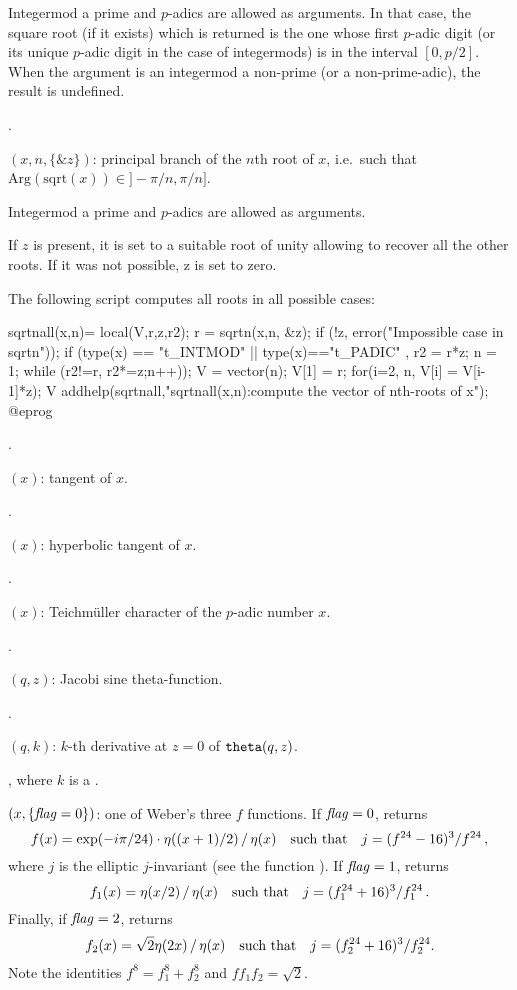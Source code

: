Integermod a prime and $p$-adics are allowed as arguments. In that case,
the square root (if it exists) which is returned is the one whose
first $p$-adic digit (or its unique $p$-adic digit in the case of
integermods) is in the interval $[0,p/2]$. When the argument is an
integermod a non-prime (or a non-prime-adic), the result is undefined.

.

$(x,n,\{\&z\})$: principal branch of the $n$th root of $x$,
i.e.~such that $\text{Arg}(\text{sqrt}(x))\in{} ]-\pi/n, \pi/n]$.

Integermod a prime and $p$-adics are allowed as arguments.

If $z$ is present, it is set to a suitable root of unity allowing to
recover all the other roots. If it was not possible, z is
set to zero.

The following script computes all roots in all possible cases:

\bprog
sqrtnall(x,n)=
{
  local(V,r,z,r2);
  r = sqrtn(x,n, &z);
  if (!z, error("Impossible case in sqrtn"));
  if (type(x) == "t_INTMOD" || type(x)=="t_PADIC" ,
    r2 = r*z; n = 1;
    while (r2!=r, r2*=z;n++));
  V = vector(n); V[1] = r;
  for(i=2, n, V[i] = V[i-1]*z);
  V
}
addhelp(sqrtnall,"sqrtnall(x,n):compute the vector of nth-roots of x");
@eprog\noindent

.

$(x)$: tangent of $x$.

.

$(x)$: hyperbolic tangent of $x$.

.

$(x)$: Teichm\"uller character of the $p$-adic number
$x$.

.

$(q,z)$: Jacobi sine theta-function.

.

$(q,k)$: $k$-th derivative at $z=0$ of
${\tt theta}(q,z)$.

, where $k$ is a .

$(x,\{\hbox{\it f\kern0pt lag\/}=0\})$: one of Weber's three $f$ functions.
If $\hbox{\it f\kern0pt lag\/}=0$, returns
$$f(x)=\exp(-i\pi/24)\cdot\eta((x+1)/2)\,/\,\eta(x) \quad\hbox{such that}\quad
j=(f^{24}-16)^3/f^{24}\,,$$
where $j$ is the elliptic $j$-invariant  (see the function ).
If $\hbox{\it f\kern0pt lag\/}=1$, returns
$$f_1(x)=\eta(x/2)\,/\,\eta(x)\quad\hbox{such that}\quad
j=(f_1^{24}+16)^3/f_1^{24}\,.$$
Finally, if $\hbox{\it f\kern0pt lag\/}=2$, returns
$$f_2(x)=\sqrt{2}\eta(2x)\,/\,\eta(x)\quad\hbox{such that}\quad
j=(f_2^{24}+16)^3/f_2^{24}.$$
Note the identities $f^8=f_1^8+f_2^8$ and $ff_1f_2=\sqrt2$.

